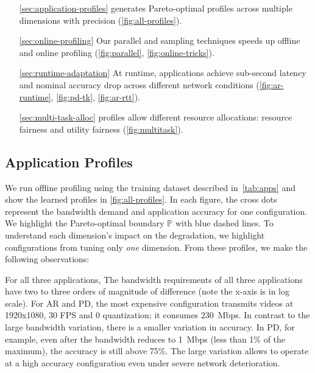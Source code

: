 \begin{itemize}[itemsep=0pt, topsep=3pt]
\item[\autoref{sec:application-profiles}] \sysname{} generates Pareto-optimal
  profiles across multiple dimensions with precision
  (\autoref{fig:all-profiles}).
\item[\autoref{sec:online-profiling}] Our parallel and sampling techniques
  speeds up offline and online profiling (\autoref{fig:parallel},
  \autoref{fig:online-tricks}).
\item[\autoref{sec:runtime-adaptation}] At runtime, \sysname{} applications
  achieve sub-second latency and nominal accuracy drop across different network
  conditions (\autoref{fig:ar-runtime}, \autoref{fig:pd-tk},
  \autoref{fig:ar-rtt}).
\item[\autoref{sec:multi-task-alloc}] \sysname{} profiles allow different
  resource allocations: resource fairness and utility fairness
  (\autoref{fig:multitask}).
\end{itemize}

\subsection{Application Profiles}
\label{sec:application-profiles}

We run offline profiling using the training dataset described
in~\autoref{tab:apps} and show the learned profiles in
\autoref{fig:all-profiles}. In each figure, the cross dots represent the
bandwidth demand and application accuracy for one configuration. We highlight
the Pareto-optimal boundary $\mathbb{P}$ with blue dashed lines. To understand
each dimension's impact on the degradation, we highlight configurations from
tuning only \textit{one} dimension. From these profiles, we make the following
observations:

 For all three applications, The bandwidth
requirements of all three applications have two to three orders of magnitude of
difference (note the x-axis is in log scale). For AR and PD, the most expensive
configuration transmits videos at 1920x1080, 30 FPS and 0 quantization; it
consumes \SI{230}{Mbps}. In contrast to the large bandwidth variation, there is
a smaller variation in accuracy. In PD, for example, even after the bandwidth
reduces to \SI{1}{Mbps} (less than 1\% of the maximum), the accuracy is still
above 75\%. The large variation allows \sysname{} to operate at a high accuracy
configuration even under severe network deterioration.

